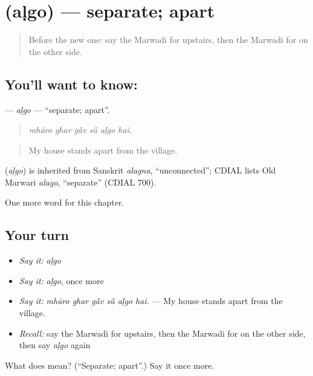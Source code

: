 \section[\texorpdfstring{\mw{अळगो} (aḷgo)}{अळगो (aḷgo)}]{ (aḷgo) — separate; apart}

\label{lesson:MW-C206-algo}



\begin{quote}
Before the new one: say the Marwadi for upstairs, then the Marwadi for on the other side.
\end{quote}

\subsection*{You'll want to know: }
\textbf{} — \emph{aḷgo} — \textquotedblleft{}separate; apart\textquotedblright{}.

\begin{quote}
     
\end{quote}

\begin{quote}
\emph{mhāro ghar gā̃v sū̃ aḷgo hai.}
\end{quote}

\begin{quote}
My house stands apart from the village.
\end{quote}

\begin{cousinweb}
\textbf{} (\emph{aḷgo}) is inherited from Sanskrit \emph{alagna}, \textquotedblleft{}unconnected\textquotedblright{}; CDIAL lists Old Marwari \emph{alago}, \textquotedblleft{}separate\textquotedblright{} (CDIAL 700).
\end{cousinweb}

\begin{grammarlens}[title={What you've built}]
One more word for this chapter.
\end{grammarlens}

\subsection*{Your turn}
\begin{itemize}
\raggedright
  \item \emph{Say it:} \emph{aḷgo}
  \item \emph{Say it:} \emph{aḷgo}, once more
  \item \emph{Say it:} \emph{mhāro ghar gā̃v sū̃ aḷgo hai.} — My house stands apart from the village.
  \item \emph{Recall:} say the Marwadi for upstairs, then the Marwadi for on the other side, then say \emph{aḷgo} again
\end{itemize}

\begin{tcolorbox}[breakable,colback=teal!4,colframe=teal!35!black,title={Before you move on}]
What does  mean? (\textquotedblleft{}Separate; apart\textquotedblright{}.) Say it once more.
\end{tcolorbox}
